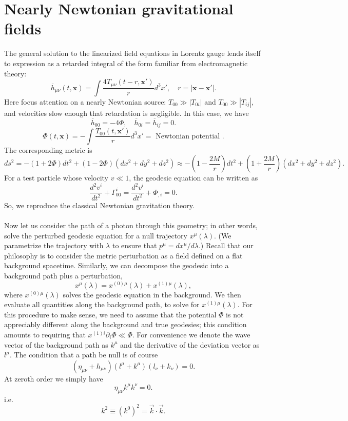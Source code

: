 \section{Nearly Newtonian gravitational fields}
The general solution to the linearized field equations in Lorentz gauge lends itself to expression as a retarded integral of the form familiar from electromagnetic theory:
\[\overline{h}_{\mu\nu}(t,\bm{x}) = \int \frac{4T_{\mu\nu}(t-r,\bm{x}')}{r} d^3x' , \quad r = |\bm{x}-\bm{x}'|.\]
Here focus attention on a nearly Newtonian source: $T_{00} \gg |T_{0i}|$ and $T_{00} \gg |T_{ij}|$, and velocities
slow enough that retardation is negligible. In this case, we have
\[\overline{h}_{00} = -4\Phi , \quad \overline{h}_{0i} = \overline{h}_{ij} = 0.\]
\[\Phi(t,\bm{x}) = -\int \frac{T_{00}(t,\bm{x}')}{r} d^3x' = \mbox{ Newtonian potential }.\]
The corresponding metric is
\[ds^2 = -(1+2\Phi)dt^2 + (1-2\Phi)(dx^2 + dy^2 + dz^2) \approx -(1-\frac{2M}{r})dt^2 + (1+\frac{2M}{r})(dx^2 + dy^2 + dz^2).\]
For a test particle whose velocity $v \ll 1$, the geodesic equation can be written as
\[\frac{d^2 v^i}{dt^2} + \Gamma^{i}_{00} = \frac{d^2 v^i}{dt^2} + \Phi_{,i} = 0.\]
So, we reproduce the classical Newtonian gravitation theory.
\\ \\
Now let us consider the path of a photon through
this geometry; in other words, solve the perturbed geodesic equation for a null trajectory $x^{\mu}(\lambda)$. (We parametrize the trajectory with $\lambda$ to ensure that $p^{\mu} = dx^{\mu}/d\lambda$.)
Recall that our philosophy is to consider the metric perturbation as a field defined on a flat background spacetime. 
Similarly, we can decompose the geodesic into a background path plus a perturbation,
\[x^{\mu}(\lambda) = x^{(0)\mu}(\lambda) + x^{(1)\mu}(\lambda),\]
where $x^{(0)\mu}(\lambda)$ solves the geodesic equation in the background. 
We then evaluate all quantities along the background path, to solve for $x^{(1)\mu}(\lambda)$. 
For this procedure to make sense, we need to assume that the potential $\Phi$ is not appreciably different along the background and true geodesies;
this condition amounts to requiring that $x^{(1)i}\partial_{i}\Phi \ll \Phi$. 
For convenience we denote the wave vector of the background path as $k^{\mu}$ and the derivative of the deviation vector as $l^{\mu}$. The condition that a path be null is of course
\[(\eta_{\mu\nu} + h_{\mu\nu})(l^{\mu}+k^{\mu})(l_{\nu} + k_{\nu}) = 0.\]
At zeroth order we simply have
\[\eta_{\mu\nu} k^{\mu} k^{\nu} = 0.\]
i.e.
\[k^2 \equiv (k^0)^2 = \vec{k}\cdot\vec{k}.\]
